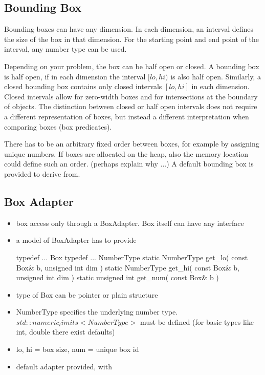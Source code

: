
\subsection*{Bounding Box}
Bounding boxes can have any dimension. In each dimension, an interval defines the size of the box in that dimension. For the starting point and end point of the interval, any number type can be used.

Depending on your problem, the box can be half open or closed. A bounding box is half open, if in each dimension the interval $[lo,hi)$ is also half open. Similarly, a closed bounding box contains only closed intervals $[lo,hi]$ in each dimension. Closed intervals allow for zero-width boxes and for intersections at the boundary of objects. The distinction between closed or half open intervals does not require a different representation of boxes, but instead a different interpretation when comparing boxes (box predicates).

There has to be an arbitrary fixed order between boxes, for example by assigning unique numbers. If boxes are allocated on the heap, also the memory location could define such an order. (perhaps explain why ...) A default bounding box is provided to derive from.

\subsection*{Box Adapter}
\begin{itemize}
\item box access only through a BoxAdapter. Box itself can have any interface
\item a model of BoxAdapter has to provide
\begin{ccExampleCode}
typedef ... Box
typedef ... NumberType
static NumberType get_lo( const Box& b, unsigned int dim )
static NumberType get_hi( const Box& b, unsigned int dim )
static unsigned int get_num( const Box& b )
\end{ccExampleCode}
\item type of Box can be pointer or plain structure
\item NumberType specifies the underlying number type. $std::numeric_limits< NumberType >$ must be defined (for basic types like int, double there exist defaults)
\item lo, hi = box size, num = unique box id
\item default adapter provided, with 
\end{itemize}

